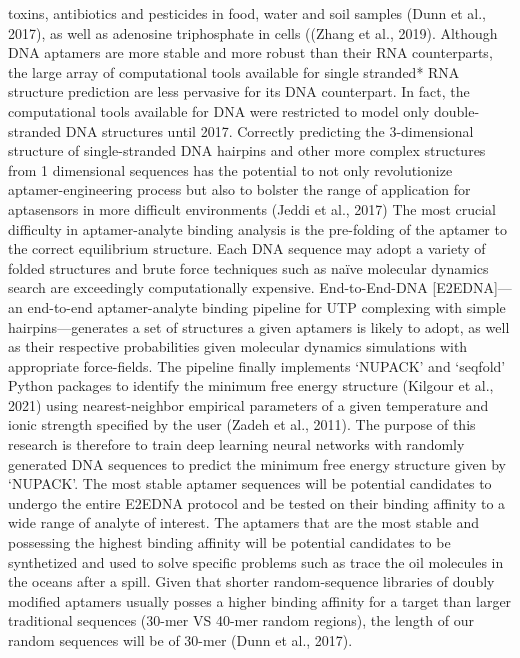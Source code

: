 \documentclass{article}
\begin{document}
 toxins, antibiotics and pesticides in food, water and soil samples (Dunn et al., 2017),
  as well as adenosine triphosphate in cells ((Zhang et al., 2019).  
Although DNA aptamers are more stable and more robust than their RNA counterparts, 
the large array of computational tools available for single stranded* 
RNA structure prediction are less pervasive for its DNA counterpart. 
In fact, the computational tools available for DNA were restricted to 
model only double-stranded DNA structures until 2017. Correctly predicting 
the 3-dimensional structure of single-stranded DNA hairpins and other 
more complex structures from 1 dimensional sequences has the potential 
to not only revolutionize aptamer-engineering process but also to bolster
 the range of application for aptasensors in more difficult environments (Jeddi et al., 2017)
 The most crucial difficulty in aptamer-analyte binding analysis is the 
 pre-folding of the aptamer to the correct equilibrium structure. Each DNA
  sequence may adopt a variety of folded structures and brute force 
  techniques such as naïve molecular dynamics search are exceedingly 
  computationally expensive. End-to-End-DNA [E2EDNA]— an end-to-end aptamer-analyte 
  binding pipeline for UTP complexing with simple hairpins—generates a set of 
  structures a given aptamers is likely to adopt, as well as their respective 
  probabilities given molecular dynamics simulations with appropriate force-fields. 
  The pipeline finally implements ‘NUPACK’ and ‘seqfold’ Python packages to identify
   the minimum free energy structure (Kilgour et al., 2021) using nearest-neighbor 
   empirical parameters of a given temperature and ionic strength specified by the
    user (Zadeh et al., 2011). 
The purpose of this research is therefore to train deep learning neural 
networks with randomly generated DNA sequences to predict the minimum 
free energy structure given by ‘NUPACK’.
The most stable aptamer sequences will be potential candidates to 
undergo the entire E2EDNA protocol and be tested on their binding 
affinity to a wide range of analyte of interest. The aptamers that 
are the most stable and possessing the highest binding affinity will 
be potential candidates to be synthetized and used to solve specific 
problems such as trace the oil molecules in the oceans after a spill. 
Given that shorter random-sequence libraries of doubly modified aptamers 
usually posses a higher binding affinity for a target than larger 
traditional sequences (30-mer VS 40-mer random regions), the length 
of our random sequences will be of 30-mer (Dunn et al., 2017). 
\end{document}
